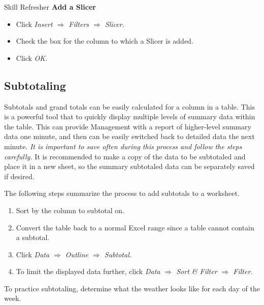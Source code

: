 \begin{center}
	\begin{sklbox}{Skill Refresher}
		\textbf{Add a Slicer}
		\\
		\begin{itemize}
			\setlength{\itemsep}{0pt}
			\setlength{\parskip}{0pt}
			\setlength{\parsep}{0pt}

			\item Click \textit{Insert $ \Rightarrow $ Filters $ \Rightarrow $ Slicer}.
			\item Check the box for the column to which a Slicer is added.
			\item Click \textit{OK}.
			
		\end{itemize}
	\end{sklbox}
\end{center}

\subsection{Subtotaling}

Subtotals and grand totals can be easily calculated for a column in a table. This is a powerful tool that to quickly display multiple levels of summary data within the table. This can provide Management with a report of higher-level summary data one minute, and then can be easily switched back to detailed data the next minute. \textit{It is important to save often during this process and follow the steps carefully.} It is recommended to make a copy of the data to be subtotaled and place it in a new sheet, so the summary subtotaled data can be separately saved if desired.

The following steps summarize the process to add subtotals to a worksheet.

\begin{enumerate}
	\item Sort by the column to subtotal on.
	\item Convert the table back to a normal Excel range since a table cannot contain a subtotal.
	\item Click \textit{Data $ \Rightarrow $ Outline $ \Rightarrow $ Subtotal}.
	\item To limit the displayed data further, click \textit{Data $ \Rightarrow $ Sort \& Filter $ \Rightarrow $ Filter}.
\end{enumerate}

To practice subtotaling, determine what the weather looks like for each day of the week.

